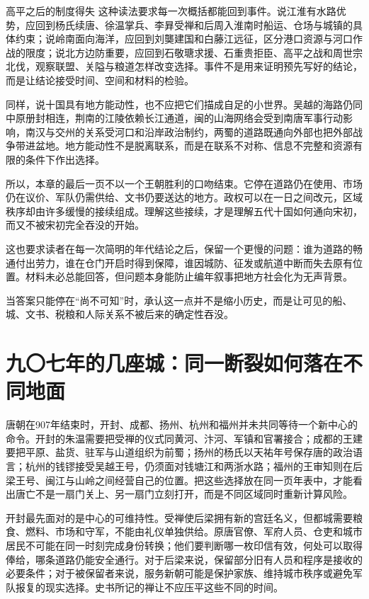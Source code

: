 \begin{causalchain}{高平之后的制度得失}
这种读法要求每一次概括都能回到事件。说江淮有水路优势，应回到杨氏续唐、徐温掌兵、李昪受禅和后周入淮南时船运、仓场与城镇的具体约束；说岭南面向海洋，应回到刘龑建国和白藤江远征，区分港口资源与河口作战的限度；说北方边防重要，应回到石敬瑭求援、石重贵拒臣、高平之战和周世宗北伐，观察联盟、关隘与粮道怎样改变选择。事件不是用来证明预先写好的结论，而是让结论接受时间、空间和材料的检验。

同样，说十国具有地方能动性，也不应把它们描成自足的小世界。吴越的海路仍同中原册封相连，荆南的江陵依赖长江通道，闽的山海网络会受到南唐军事行动影响，南汉与交州的关系受河口和沿岸政治制约，两蜀的道路既通向外部也把外部战争带进盆地。地方能动性不是脱离联系，而是在联系不对称、信息不完整和资源有限的条件下作出选择。

所以，本章的最后一页不以一个王朝胜利的口吻结束。它停在道路仍在使用、市场仍在议价、军队仍需供给、文书仍要送达的地方。政权可以在一日之间改元，区域秩序却由许多缓慢的接续组成。理解这些接续，才是理解五代十国如何通向宋初，而又不被宋初完全吞没的开始。

这也要求读者在每一次简明的年代结论之后，保留一个更慢的问题：谁为道路的畅通付出劳力，谁在仓门开启时得到保障，谁因城防、征发或航道中断而失去原有位置。材料未必总能回答，但问题本身能防止编年叙事把地方社会化为无声背景。

当答案只能停在“尚不可知”时，承认这一点并不是缩小历史，而是让可见的船、城、文书、税粮和人际关系不被后来的确定性吞没。

\section{九〇七年的几座城：同一断裂如何落在不同地面}

唐朝在907年结束时，开封、成都、扬州、杭州和福州并未共同等待一个新中心的命令。开封的朱温需要把受禅的仪式同黄河、汴河、军镇和官署接合；成都的王建要把平原、盐货、驻军与山道组织为前蜀；扬州的杨氏以天祐年号保存唐的政治语言；杭州的钱镠接受吴越王号，仍须面对钱塘江和两浙水路；福州的王审知则在后梁王号、闽江与山岭之间经营自己的位置。把这些选择放在同一页年表中，才能看出唐亡不是一扇门关上、另一扇门立刻打开，而是不同区域同时重新计算风险。

开封最先面对的是中心的可维持性。受禅使后梁拥有新的宫廷名义，但都城需要粮食、燃料、市场和守军，不能由礼仪单独供给。原唐官僚、军府人员、仓吏和城市居民不可能在同一时刻完成身份转换；他们要判断哪一枚印信有效，何处可以取得俸给，哪条道路仍能安全通行。对于后梁来说，保留部分旧有人员和程序是接收的必要条件；对于被保留者来说，服务新朝可能是保护家族、维持城市秩序或避免军队报复的现实选择。史书所记的禅让不应压平这些不同的时间。


\end{causalchain}
